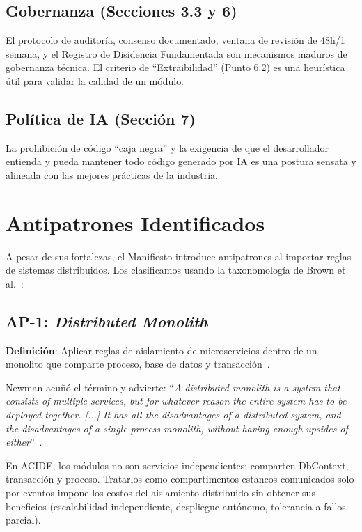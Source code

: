 \documentclass[conference]{IEEEtran}
\begin{document}
\subsection{Gobernanza (Secciones 3.3 y 6)}
El protocolo de auditor\'ia, consenso documentado, ventana de revisi\'on de 48h/1 semana, y el Registro de Disidencia Fundamentada son mecanismos maduros de gobernanza t\'ecnica. El criterio de ``Extraibilidad'' (Punto 6.2) es una heur\'istica \'util para validar la calidad de un m\'odulo.

\subsection{Pol\'itica de IA (Secci\'on 7)}
La prohibici\'on de c\'odigo ``caja negra'' y la exigencia de que el desarrollador entienda y pueda mantener todo c\'odigo generado por IA es una postura sensata y alineada con las mejores pr\'acticas de la industria.


\section{Antipatrones Identificados}
\label{sec:antipatrones}

A pesar de sus fortalezas, el Manifiesto introduce antipatrones al importar reglas de sistemas distribuidos. Los clasificamos usando la taxonomolog\'ia de Brown et al.~\cite{brown1998}:

\subsection{AP-1: \textit{Distributed Monolith}}
\textbf{Definici\'on}: Aplicar reglas de aislamiento de microservicios dentro de un monolito que comparte proceso, base de datos y transacci\'on~\cite{newman2019}.

Newman acu\~n\'o el t\'ermino y advierte: ``\textit{A distributed monolith is a system that consists of multiple services, but for whatever reason the entire system has to be deployed together. [...] It has all the disadvantages of a distributed system, and the disadvantages of a single-process monolith, without having enough upsides of either}''~\cite{newman2015}.

En ACIDE, los m\'odulos no son servicios independientes: comparten DbContext, transacci\'on y proceso. Tratarlos como compartimentos estancos comunicados solo por eventos impone los costos del aislamiento distribuido sin obtener sus beneficios (escalabilidad independiente, despliegue aut\'onomo, tolerancia a fallos parcial).
\end{document}
